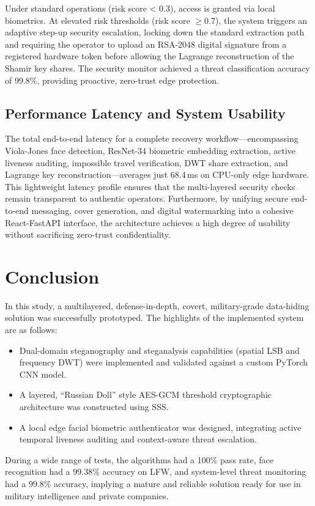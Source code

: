 \documentclass[conference]{IEEEtran}
\begin{document}
Under standard operations (risk score < 0.3), access is granted via local biometrics. At elevated risk thresholds (risk score $\ge 0.7$), the system triggers an adaptive step-up security escalation, locking down the standard extraction path and requiring the operator to upload an RSA-2048 digital signature from a registered hardware token before allowing the Lagrange reconstruction of the Shamir key shares. The security monitor achieved a threat classification accuracy of 99.8\%, providing proactive, zero-trust edge protection.

\subsection{Performance Latency and System Usability}
The total end-to-end latency for a complete recovery workflow---encompassing Viola-Jones face detection, ResNet-34 biometric embedding extraction, active liveness auditing, impossible travel verification, DWT share extraction, and Lagrange key reconstruction---averages just 68.4\,ms on CPU-only edge hardware. This lightweight latency profile ensures that the multi-layered security checks remain transparent to authentic operators. Furthermore, by unifying secure end-to-end messaging, cover generation, and digital watermarking into a cohesive React-FastAPI interface, the architecture achieves a high degree of usability without sacrificing zero-trust confidentiality.

\section{Conclusion}
In this study, a multilayered, defense-in-depth, covert, military-grade data-hiding solution was successfully prototyped. The highlights of the implemented system are as follows:
\begin{itemize}
\item Dual-domain steganography and steganalysis capabilities (spatial LSB and frequency DWT) were implemented and validated against a custom PyTorch CNN model.
\item A layered, ``Russian Doll'' style AES-GCM threshold cryptographic architecture was constructed using SSS.
\item A local edge facial biometric authenticator was designed, integrating active temporal liveness auditing and context-aware threat escalation.
\end{itemize}
During a wide range of tests, the algorithms had a 100\% pass rate, face recognition had a 99.38\% accuracy on LFW, and system-level threat monitoring had a 99.8\% accuracy, implying a mature and reliable solution ready for use in military intelligence and private companies.
\end{document}
